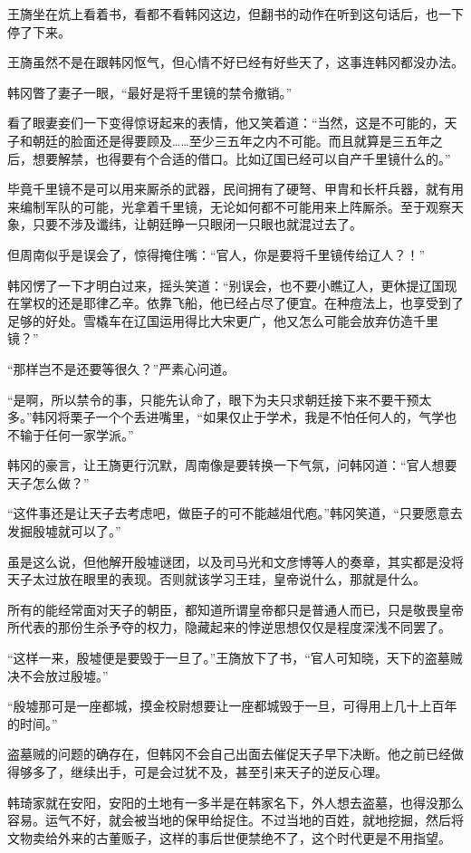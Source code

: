 王旖坐在炕上看着书，看都不看韩冈这边，但翻书的动作在听到这句话后，也一下停了下来。

王旖虽然不是在跟韩冈怄气，但心情不好已经有好些天了，这事连韩冈都没办法。

韩冈瞥了妻子一眼，“最好是将千里镜的禁令撤销。”

看了眼妻妾们一下变得惊讶起来的表情，他又笑着道：“当然，这是不可能的，天子和朝廷的脸面还是得要顾及……至少三五年之内不可能。而且就算是三五年之后，想要解禁，也得要有个合适的借口。比如辽国已经可以自产千里镜什么的。”

毕竟千里镜不是可以用来厮杀的武器，民间拥有了硬弩、甲胄和长杆兵器，就有用来编制军队的可能，光拿着千里镜，无论如何都不可能用来上阵厮杀。至于观察天象，只要不涉及谶纬，让朝廷睁一只眼闭一只眼也就混过去了。

但周南似乎是误会了，惊得掩住嘴：“官人，你是要将千里镜传给辽人？！”

韩冈愣了一下才明白过来，摇头笑道：“别误会，也不要小瞧辽人，更休提辽国现在掌权的还是耶律乙辛。依靠飞船，他已经占尽了便宜。在种痘法上，也享受到了足够的好处。雪橇车在辽国运用得比大宋更广，他又怎么可能会放弃仿造千里镜？”

“那样岂不是还要等很久？”严素心问道。

“是啊，所以禁令的事，只能先认命了，眼下为夫只求朝廷接下来不要干预太多。”韩冈将栗子一个个丢进嘴里，“如果仅止于学术，我是不怕任何人的，气学也不输于任何一家学派。”

韩冈的豪言，让王旖更行沉默，周南像是要转换一下气氛，问韩冈道：“官人想要天子怎么做？”

“这件事还是让天子去考虑吧，做臣子的可不能越俎代庖。”韩冈笑道，“只要愿意去发掘殷墟就可以了。”

虽是这么说，但他解开殷墟谜团，以及司马光和文彦博等人的奏章，其实都是没将天子太过放在眼里的表现。否则就该学习王珪，皇帝说什么，那就是什么。

所有的能经常面对天子的朝臣，都知道所谓皇帝都只是普通人而已，只是敬畏皇帝所代表的那份生杀予夺的权力，隐藏起来的悖逆思想仅仅是程度深浅不同罢了。

“这样一来，殷墟便是要毁于一旦了。”王旖放下了书，“官人可知晓，天下的盗墓贼决不会放过殷墟。”

“殷墟那可是一座都城，摸金校尉想要让一座都城毁于一旦，可得用上几十上百年的时间。”

盗墓贼的问题的确存在，但韩冈不会自己出面去催促天子早下决断。他之前已经做得够多了，继续出手，可是会过犹不及，甚至引来天子的逆反心理。

韩琦家就在安阳，安阳的土地有一多半是在韩家名下，外人想去盗墓，也得没那么容易。运气不好，就会被当地的保甲给捉住。不过当地的百姓，就地挖掘，然后将文物卖给外来的古董贩子，这样的事后世便禁绝不了，这个时代更是不用指望。


